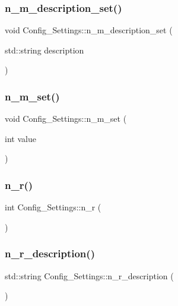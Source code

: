 \subsubsection{\texorpdfstring{n\+\_\+m\+\_\+description\+\_\+set()}{n\_m\_description\_set()}}
{\footnotesize\ttfamily void Config\+\_\+\+Settings\+::n\+\_\+m\+\_\+description\+\_\+set (\begin{DoxyParamCaption}\item[{std\+::string}]{description }\end{DoxyParamCaption})}

\mbox{\label{class_config___settings_a3ed0c682ef8ee538075b4b61937819a7}} 
\subsubsection{\texorpdfstring{n\+\_\+m\+\_\+set()}{n\_m\_set()}}
{\footnotesize\ttfamily void Config\+\_\+\+Settings\+::n\+\_\+m\+\_\+set (\begin{DoxyParamCaption}\item[{int}]{value }\end{DoxyParamCaption})}

\mbox{\label{class_config___settings_ae71c4b873c05bfba67d92929adf817b1}} 
\subsubsection{\texorpdfstring{n\+\_\+r()}{n\_r()}}
{\footnotesize\ttfamily int Config\+\_\+\+Settings\+::n\+\_\+r (\begin{DoxyParamCaption}{ }\end{DoxyParamCaption})}

\mbox{\label{class_config___settings_a8c3ebb61d80cb5badc1850eb13bfd771}} 
\subsubsection{\texorpdfstring{n\+\_\+r\+\_\+description()}{n\_r\_description()}}
{\footnotesize\ttfamily std\+::string Config\+\_\+\+Settings\+::n\+\_\+r\+\_\+description (\begin{DoxyParamCaption}{ }\end{DoxyParamCaption})}

